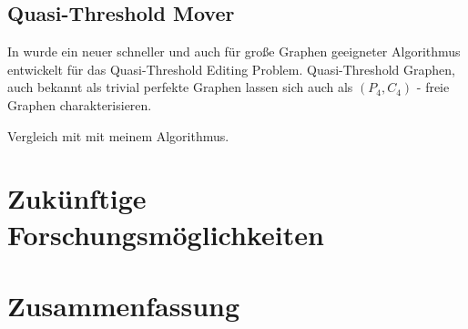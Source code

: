 \documentclass[12pt,a4paper,onecolumn,oneside,titlepage]{article}
\begin{document}
\subsection{Quasi-Threshold Mover}
In \cite{BrandesHSW15} wurde ein neuer schneller und auch für große Graphen geeigneter Algorithmus entwickelt für das Quasi-Threshold Editing Problem. Quasi-Threshold Graphen, auch bekannt als trivial perfekte Graphen lassen sich auch als $(P_4, C_4)$ - freie Graphen charakterisieren. 


Vergleich mit mit meinem Algorithmus.


\section{Zukünftige Forschungsmöglichkeiten}
\section{Zusammenfassung}




\end{document}
